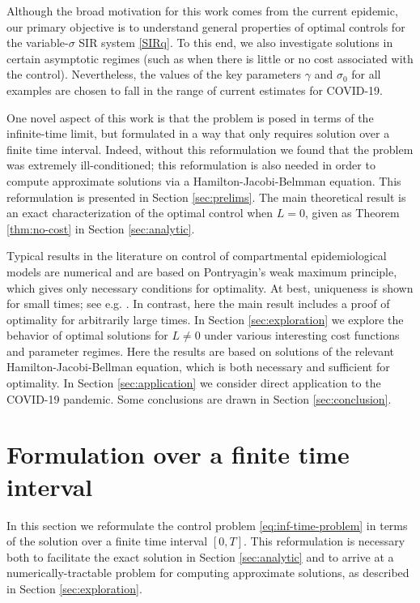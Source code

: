 \documentclass[english,12pt,letter]{article}
\newcommand{\Rnot}{\sigma_0}
\begin{document}
Although the broad motivation for this work comes from the current epidemic,
our primary objective is to understand general properties of optimal controls
for the variable-$\sigma$ SIR system \eqref{SIRq}.  To this end, we also
investigate solutions in certain
asymptotic regimes (such as when there is little or no cost associated
with the control).  Nevertheless, the values of the key parameters $\gamma$
and $\Rnot$ for all examples are chosen to fall in the range of current estimates for
COVID-19.

One novel aspect of this work is that the problem is posed in terms of the
infinite-time limit, but formulated in a way that only requires solution
over a finite time interval.  Indeed, without this reformulation we found
that the problem was extremely ill-conditioned; this reformulation is also
needed in order to compute approximate solutions via a Hamilton-Jacobi-Belmman
equation.
This reformulation is presented in Section \ref{sec:prelims}.  The main theoretical
result is an exact characterization of the optimal control when $L=0$, given
as Theorem \ref{thm:no-cost} in Section \ref{sec:analytic}.  

Typical results in the literature on control of compartmental epidemiological models
are numerical and are based on Pontryagin's weak maximum principle, which gives only
necessary conditions for optimality.  At best, uniqueness is shown for small times; see e.g. 
\cite{kirschner1997optimal,fister1998optimizing,jung2002optimal,yan2008optimal,kar2011stability,sharomi2017optimal}.
In contrast, here the main result includes a proof of optimality for arbitrarily large times.
In Section \ref{sec:exploration} we explore
the behavior of optimal solutions for $L\ne 0$ under various interesting
cost functions and parameter regimes.  Here the results are based on
solutions of the relevant Hamilton-Jacobi-Bellman equation, which is
both necessary and sufficient for optimality.
In Section \ref{sec:application} we consider direct application to the COVID-19
pandemic.  Some conclusions are drawn in Section \ref{sec:conclusion}.

\section{Formulation over a finite time interval\label{sec:prelims}}
In this section we reformulate the control problem \eqref{eq:inf-time-problem} in terms of
the solution over a finite time interval $[0,T]$.  This reformulation is
necessary both to facilitate the exact solution in Section \ref{sec:analytic}
and to arrive at a numerically-tractable problem for computing
approximate solutions, as described in Section \ref{sec:exploration}.
\end{document}
